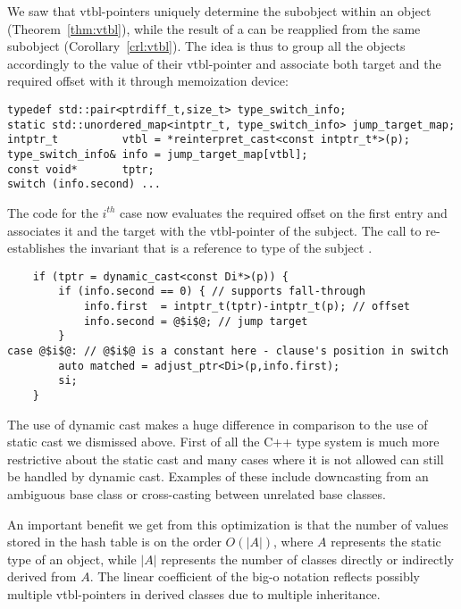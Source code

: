 We saw that vtbl-pointers uniquely determine the subobject within an object 
(Theorem~\ref{thm:vtbl}), while the result of a  can be reapplied 
from the same subobject (Corollary~\ref{crl:vtbl}). The idea is thus to group 
all the objects accordingly to the value of their vtbl-pointer and associate both 
target and the required offset with it through memoization device:

\begin{lstlisting}
typedef std::pair<ptrdiff_t,size_t> type_switch_info;
static std::unordered_map<intptr_t, type_switch_info> jump_target_map;
intptr_t          vtbl = *reinterpret_cast<const intptr_t*>(p);
type_switch_info& info = jump_target_map[vtbl];
const void*       tptr; 
switch (info.second) ...
\end{lstlisting}

\noindent
The code for the $i^{th}$ case now evaluates the required offset on the first 
entry and associates it and the target with the vtbl-pointer of the subject.
The call to  re-establishes the invariant that 
 is a reference to type  of the subject .

\begin{lstlisting}
    if (tptr = dynamic_cast<const Di*>(p)) {
        if (info.second == 0) { // supports fall-through
            info.first  = intptr_t(tptr)-intptr_t(p); // offset
            info.second = @$i$@; // jump target
        }
case @$i$@: // @$i$@ is a constant here - clause's position in switch
        auto matched = adjust_ptr<Di>(p,info.first); 
        si;
    }
\end{lstlisting}

\noindent
The use of dynamic cast makes a huge difference in comparison to the use of 
static cast we dismissed above. First of all the C++ type system is much more 
restrictive about the static cast and many cases where it is not allowed can 
still be handled by dynamic cast. Examples of these include downcasting from an 
ambiguous base class or cross-casting between unrelated base classes.

An important benefit we get from this optimization is that the number of values 
stored in the hash table is on the order $O(|A|)$, where $A$ represents the 
static type of an object, while $|A|$ represents the number of classes directly 
or indirectly derived from $A$. The linear coefficient of the big-o notation 
reflects possibly multiple vtbl-pointers in derived classes due to multiple 
inheritance.

